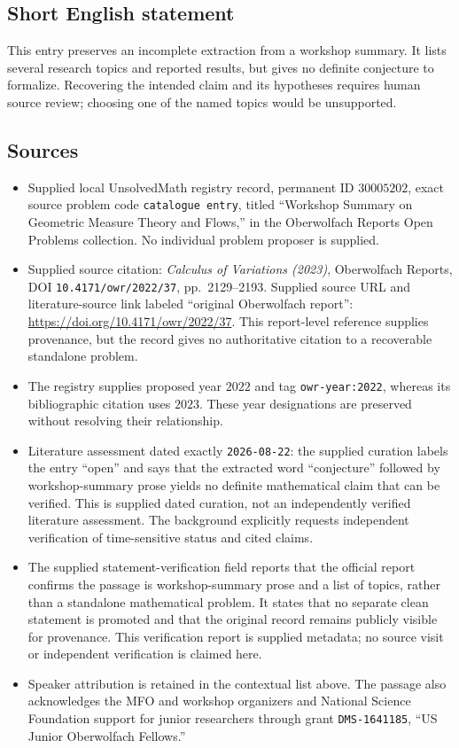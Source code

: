 \documentclass[11pt]{article}
\begin{document}
\subsection{Short English statement}
This entry preserves an incomplete extraction from a workshop summary. It lists several research topics and reported results, but gives no definite conjecture to formalize. Recovering the intended claim and its hypotheses requires human source review; choosing one of the named topics would be unsupported.
\subsection{Sources}
\begin{itemize}
\item Supplied local UnsolvedMath registry record, permanent ID \(30005202\), exact source problem code \texttt{catalogue entry}, titled ``Workshop Summary on Geometric Measure Theory and Flows,'' in the Oberwolfach Reports Open Problems collection. No individual problem proposer is supplied.
\item Supplied source citation: \emph{Calculus of Variations (2023)}, Oberwolfach Reports, DOI \texttt{10.4171/owr/2022/37}, pp.~2129--2193. Supplied source URL and literature-source link labeled ``original Oberwolfach report'': \url{https://doi.org/10.4171/owr/2022/37}. This report-level reference supplies provenance, but the record gives no authoritative citation to a recoverable standalone problem.
\item The registry supplies proposed year \(2022\) and tag \texttt{owr-year:2022}, whereas its bibliographic citation uses \(2023\). These year designations are preserved without resolving their relationship.
\item Literature assessment dated exactly \texttt{2026-08-22}: the supplied curation labels the entry ``open'' and says that the extracted word ``conjecture'' followed by workshop-summary prose yields no definite mathematical claim that can be verified. This is supplied dated curation, not an independently verified literature assessment. The background explicitly requests independent verification of time-sensitive status and cited claims.
\item The supplied statement-verification field reports that the official report confirms the passage is workshop-summary prose and a list of topics, rather than a standalone mathematical problem. It states that no separate clean statement is promoted and that the original record remains publicly visible for provenance. This verification report is supplied metadata; no source visit or independent verification is claimed here.
\item Speaker attribution is retained in the contextual list above. The passage also acknowledges the MFO and workshop organizers and National Science Foundation support for junior researchers through grant \texttt{DMS-1641185}, ``US Junior Oberwolfach Fellows.''
\end{itemize}
\end{document}
